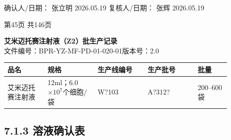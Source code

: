 \documentclass[UTF8,10pt,a4paper,fontset=fandol]{ctexart}
\newcommand{\fieldvalue}[1]{#1}
\newcommand{\handwritten}[1]{#1}
\begin{document}
\noindent
确认人/日期：
\fieldvalue{\handwritten{张立明}}
\quad
\fieldvalue{\handwritten{2026.05.19}}
\hfill
复核人/日期：
\fieldvalue{\handwritten{张辉}}
\quad
\fieldvalue{\handwritten{2026.05.19}}

\begin{center}
第45页 共146页
\end{center}

\newpage

\begin{center}
\textbf{艾米迈托赛注射液（Z2）批生产记录}\\
文件编号：BPR-YZ-MF-PD-01-020-01\quad 版本号：2.0
\end{center}

\begin{tabular}{|p{0.16\linewidth}|p{0.20\linewidth}|p{0.20\linewidth}|p{0.20\linewidth}|p{0.13\linewidth}|}
\hline
品名 & 规格 & 生产线编号 & 生产批号 & 批量\\
\hline
艾米迈托赛注射液 &
12ml；6.0$\times 10^7$个细胞/袋 &
\fieldvalue{\handwritten{W?103}} &
\fieldvalue{\handwritten{A?312?}} &
200--600袋\\
\hline
\end{tabular}

\subsection*{7.1.3 溶液确认表}
\end{document}
